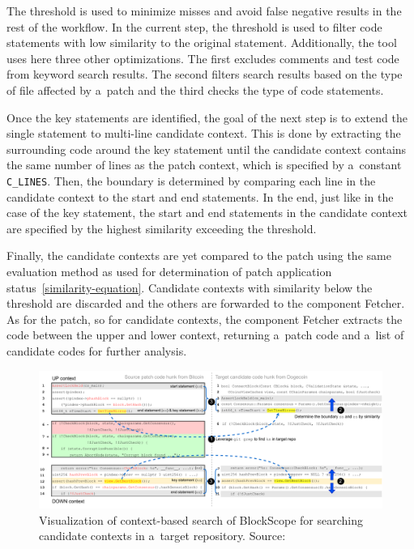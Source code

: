     The threshold is used to minimize misses and avoid false negative results in the rest of the workflow.
    In the current step, the threshold is used to filter code statements with low similarity to the original
    statement. Additionally, the tool uses here three other optimizations. The first excludes comments and test code
    from keyword search results. The second filters search results based on the type of file affected by a~patch
    and the third checks the type of code statements.

    Once the key statements are identified, the goal of the next step is to extend the single statement to multi-line
    candidate context. This is done by extracting the surrounding code around the key statement until the candidate
    context contains the same number of lines as the patch context, which is specified by a~constant \texttt{C\_LINES}.
    Then, the boundary is determined by comparing each line in the candidate context to the start and end statements.
    In the end, just like in the case of the key statement, the start and end statements in the candidate context are specified
    by the highest similarity exceeding the threshold.

    Finally, the candidate contexts are yet compared to the patch using the same evaluation method as used for
    determination of patch application status~\ref{similarity-equation}.
    Candidate contexts with similarity below the threshold are discarded and the others are forwarded to the component
    Fetcher. As for the patch, so for candidate contexts, the component Fetcher extracts the code between the upper and lower
    context, returning a~patch code and a~list of candidate codes for further analysis.

    \begin{figure}[h]
      \centering
      \includegraphics[width=1\textwidth]{obrazky-figures/blockscope_search.drawio.pdf}
      \caption{Visualization of context-based search of BlockScope for searching candidate contexts in a~target repository.
       Source:~\cite{BlockScope}}
      \label{figure:blockscope-search}
    \end{figure}


